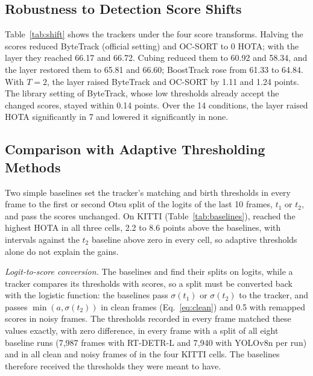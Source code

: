 







\subsection{Robustness to Detection Score Shifts}\label{sec:shift}
Table~\ref{tab:shift} shows the trackers under the four score transforms. Halving the scores
reduced ByteTrack (official setting) and OC-SORT to 0 HOTA; with the layer they reached 66.17 and
66.72. Cubing reduced them to 60.92 and 58.34, and the layer restored them to 65.81 and 66.60;
BoostTrack rose from 61.33 to 64.84. With $T=2$, the layer raised ByteTrack and OC-SORT by 1.11 and
1.24 points. The library setting of ByteTrack, whose low thresholds already accept the changed
scores, stayed within 0.14 points. Over the 14 conditions, the layer raised HOTA significantly in 7
and lowered it significantly in none.


\subsection{Comparison with Adaptive Thresholding Methods}\label{sec:baselines}
Two simple baselines set the tracker's matching and birth thresholds in every frame to the first or
second Otsu split of the logits of the last 10 frames, $t_1$ or $t_2$, and pass the scores
unchanged. On KITTI (Table~\ref{tab:baselines}), \scl{} reached the highest HOTA in all three
cells, 2.2 to 8.6 points above the baselines, with intervals against the $t_2$ baseline above zero
in every cell, so adaptive thresholds alone do not explain the gains.

\emph{Logit-to-score conversion.} The baselines and \scl{} find their splits on logits, while a
tracker compares its thresholds with scores, so a split must be converted back with the logistic
function: the baselines pass $\sigma(t_1)$ or $\sigma(t_2)$ to the tracker, and \scl{} passes
$\min(a,\sigma(t_2))$ in clean frames (Eq.~\eqref{eq:clean}) and 0.5 with remapped scores in noisy
frames. The thresholds recorded in every frame matched these values exactly, with zero difference,
in every frame with a split of all eight baseline runs (7,987 frames with RT-DETR-L and 7,940
with YOLOv8n per run) and in all clean and noisy frames of \scl{} in the four KITTI cells. The baselines therefore received the thresholds they were meant to have.


